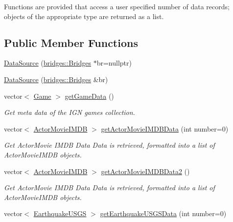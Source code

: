 Functions are provided that access a user specified number of data records; objects of the appropriate type are returned as a list. \subsection*{Public Member Functions}
\begin{DoxyCompactItemize}
\item 
\hyperlink{classbridges_1_1_data_source_afc95b52d2ca03a92c1f1ee1594a097c7}{Data\+Source} (\hyperlink{classbridges_1_1_bridges}{bridges\+::\+Bridges} $\ast$br=nullptr)
\item 
\hyperlink{classbridges_1_1_data_source_a0da0dc59d798aa3266df7931a396a4c9}{Data\+Source} (\hyperlink{classbridges_1_1_bridges}{bridges\+::\+Bridges} \&br)
\item 
vector$<$ \hyperlink{classbridges_1_1dataset_1_1_game}{Game} $>$ \hyperlink{classbridges_1_1_data_source_aa902e1dffd4169e2f6e6820299b8cde1}{get\+Game\+Data} ()
\begin{DoxyCompactList}\small\item\em Get meta data of the I\+GN games collection. \end{DoxyCompactList}\item 
vector$<$ \hyperlink{classbridges_1_1dataset_1_1_actor_movie_i_m_d_b}{Actor\+Movie\+I\+M\+DB} $>$ \hyperlink{classbridges_1_1_data_source_a664694136550312ab3f5a82bebb91bca}{get\+Actor\+Movie\+I\+M\+D\+B\+Data} (int number=0)
\begin{DoxyCompactList}\small\item\em Get Actor\+Movie I\+M\+DB Data Data is retrieved, formatted into a list of Actor\+Movie\+I\+M\+DB objects. \end{DoxyCompactList}\item 
vector$<$ \hyperlink{classbridges_1_1dataset_1_1_actor_movie_i_m_d_b}{Actor\+Movie\+I\+M\+DB} $>$ \hyperlink{classbridges_1_1_data_source_a00f0a0a1871d4864c6ccdd04195e0fb2}{get\+Actor\+Movie\+I\+M\+D\+B\+Data2} ()
\begin{DoxyCompactList}\small\item\em Get Actor\+Movie I\+M\+DB Data Data is retrieved, formatted into a list of Actor\+Movie\+I\+M\+DB objects. \end{DoxyCompactList}\item 
vector$<$ \hyperlink{classbridges_1_1dataset_1_1_earthquake_u_s_g_s}{Earthquake\+U\+S\+GS} $>$ \hyperlink{classbridges_1_1_data_source_a6645e2029915550fcac5f9fed7870119}{get\+Earthquake\+U\+S\+G\+S\+Data} (int number=0)

\end{DoxyCompactItemize}

